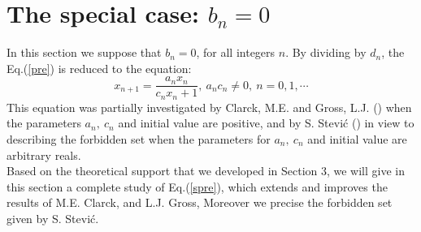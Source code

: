 \documentclass[11pt]{amsart}
\theoremstyle{definition}
\theoremstyle{remark}
\theoremstyle{example}
\numberwithin{equation}{section}
\begin{document}
\section{\bf The special case: $b_n=0$ }
In this section we suppose that $b_n=0$, for all integers $n$. By dividing by $d_n$, the Eq.(\ref{pre}) is reduced to the equation:
\begin{equation}
x_{n+1}=\frac{a_nx_n}{c_nx_n+1}, \ a_nc_n\neq0, \ n=0,1,\cdots \label{spre}
\end{equation}
This equation was partially investigated by Clarck, M.E. and Gross, L.J. (\cite{8}) when the parameters $a_n, \ c_n$ and initial
value are positive, and by S. Stevi\'c (\cite{7}) in view to describing the forbidden set when the parameters for $a_n, \ c_n$ and initial value are arbitrary reals.\\
Based on the theoretical support that we developed in Section 3, we will give in this section a complete study of
Eq.(\ref{spre}), which extends and improves the results of M.E. Clarck, and L.J. Gross,
Moreover we precise the forbidden set given by S. Stevi\'c.\\
\end{document}
